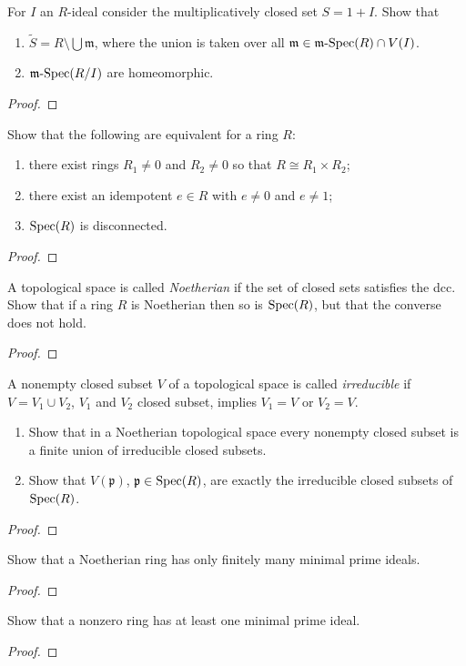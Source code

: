 \begin{problem}
For $I$ an $R$-ideal consider the multiplicatively
closed set $S=1+I$. Show that
\begin{enumerate}[noitemsep,label=(\alph*)]
\item $\widetilde S=R\setminus\bigcup\mathfrak{m}$, where the
  union is taken over all
  $\mathfrak{m}\in\text{${\mathfrak{m}}$-$\operatorname{Spec}$}(R)\cap V(I)$.
\item $\text{${\mathfrak{m}}$-$\operatorname{Spec}$}(R/I)$ are homeomorphic.
\end{enumerate}
\end{problem}
\begin{proof}
\end{proof}
\newpage
\begin{problem}
Show that the following are equivalent for a ring $R$:
\begin{enumerate}[noitemsep,label=(\alph*)]
\item there exist rings $R_1\neq 0$ and $R_2\neq 0$ so that
  $R\cong R_1\times R_2$;
\item there exist an idempotent $e\in R$ with $e\neq 0$ and
  $e\neq 1$;
\item $\operatorname{Spec}(R)$ is disconnected.
\end{enumerate}
\end{problem}
\begin{proof}
\end{proof}
\newpage
\begin{problem}
A topological space is called \emph{Noetherian} if the set of
closed sets satisfies the dcc. Show that if a ring $R$ is
Noetherian then so is $\operatorname{Spec}(R)$, but that the converse does not
hold.
\end{problem}
\begin{proof}
\end{proof}
\newpage
\begin{problem}
A nonempty closed subset $V$ of a topological space is called
\emph{irreducible} if $V=V_1\cup V_2$, $V_1$ and $V_2$ closed
subset, implies $V_1=V$ or $V_2=V$.
\begin{enumerate}[noitemsep,label=(\alph*)]
\item Show that in a Noetherian topological space every nonempty
  closed subset is a finite union of irreducible closed subsets.
\item Show that $V(\mathfrak{p})$, $\mathfrak{p}\in\operatorname{Spec}(R)$, are
  exactly the irreducible closed subsets of $\operatorname{Spec}(R)$.
\end{enumerate}
\end{problem}
\begin{proof}
\end{proof}
\newpage
\begin{problem}
Show that a Noetherian ring has only finitely many minimal prime
ideals.
\end{problem}
\begin{proof}
\end{proof}
\newpage
\begin{problem}
Show that a nonzero ring has at least one minimal prime ideal.
\end{problem}
\begin{proof}
\end{proof}

